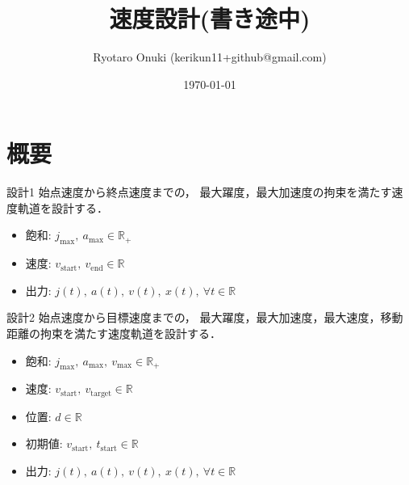 \documentclass[a5paper]{ltjsarticle}
\title{速度設計(書き途中)}
\author{Ryotaro Onuki (kerikun11+github@gmail.com)}
\date{\today}
\begin{document}
\maketitle
\section{概要}
\begin{itembox}[l]{設計1}
    \quad
    始点速度から終点速度までの，
    最大躍度，最大加速度の拘束を満たす速度軌道を設計する．
    \begin{itemize}
        \item 飽和: $j_{\max},~ a_{\max} \in \mathbb{R}_+$
        \item 速度: $v_\mathrm{start},~ v_\mathrm{end} \in \mathbb{R}$
        \item 出力: $j(t),~ a(t),~ v(t),~ x(t),~ \forall t \in \mathbb{R}$
    \end{itemize}
\end{itembox}
\begin{itembox}[l]{設計2}
    \quad
    始点速度から目標速度までの，
    最大躍度，最大加速度，最大速度，移動距離の拘束を満たす速度軌道を設計する．
    \begin{itemize}
        \item 飽和: $j_{\max},~ a_{\max},~ v_{\max} \in \mathbb{R}_+$
        \item 速度: $v_\mathrm{start},~ v_\mathrm{target} \in \mathbb{R}$
        \item 位置: $d \in \mathbb{R}$
        \item 初期値: $v_\mathrm{start},~ t_\mathrm{start} \in \mathbb{R}$
        \item 出力: $j(t),~ a(t),~ v(t),~ x(t),~ \forall t \in \mathbb{R}$
    \end{itemize}
\end{itembox}
\end{document}
